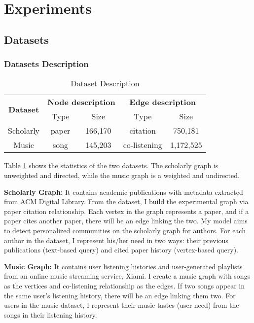 \section{Experiments}

\subsection{Datasets} 
\subsubsection{Datasets Description} 

 
\begin{table}[h]
	\centering
	
	\begin{tabular}{ccccc} 
		\toprule
		\multirow{2}{*}{\textbf{Dataset}}  &\multicolumn{2}{c}{\textbf{Node description }} & \multicolumn{2}{c}{\textbf{Edge description}}\\ \cmidrule(lr){2-5}%
		& Type & Size & Type & Size \\ \midrule 
		Scholarly & paper & 166,170 & citation &750,181\\ \midrule 
		Music & song & 145,203 & co-listening &1,172,525
		\\ \bottomrule
	\end{tabular}
	\caption{Dataset Description}
	\label{tab:dataset}
\end{table} 

Table \ref{tab:dataset} shows the statistics of the two datasets.  The scholarly graph is unweighted and directed, while the music graph is a weighted and undirected.

\textbf{Scholarly Graph:} It contains academic publications with metadata extracted from ACM Digital Library. From the dataset, I build the experimental graph via paper citation relationship. Each vertex in the graph represents a paper, and if a paper cites another paper, there will be an edge linking the two. My model aims to detect personalized communities on the scholarly graph for authors. For each author in the dataset, I represent his/her need in two ways: their previous publications (text-based query) and cited paper history (vertex-based query).  

\textbf{Music Graph:} It contains user listening histories and user-generated playlists from an online music streaming service, Xiami. I create a music graph with songs as the vertices and co-listening relationship as the edges. If two songs appear in the same user's listening history, there will be an edge linking them two. For users in the music dataset, I represent their music tastes (user need) from the songs in their listening history.  

